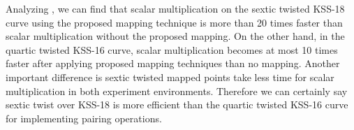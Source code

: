 \renewcommand{\arraystretch}{1.5}{
\begin{table}[ht]
\centering
\caption{ Comparative result of average execution time in [ms] for scalar multiplication}
\label{table_opeationcomp_chap_ijnc2017}
\end{table}
}

Analyzing   , we can find that scalar multiplication on the sextic twisted KSS-18 curve using the proposed  mapping technique is more than 20 times faster than scalar multiplication without the proposed mapping. 
On the other hand, in the quartic twisted KSS-16 curve, scalar multiplication becomes at most 10 times faster after applying proposed mapping techniques than no mapping. 
Another important difference is sextic twisted mapped points take less  time for scalar multiplication in both experiment environments. Therefore we can certainly say sextic twist over KSS-18 is more efficient than the quartic twisted KSS-16 curve for implementing  pairing operations.

